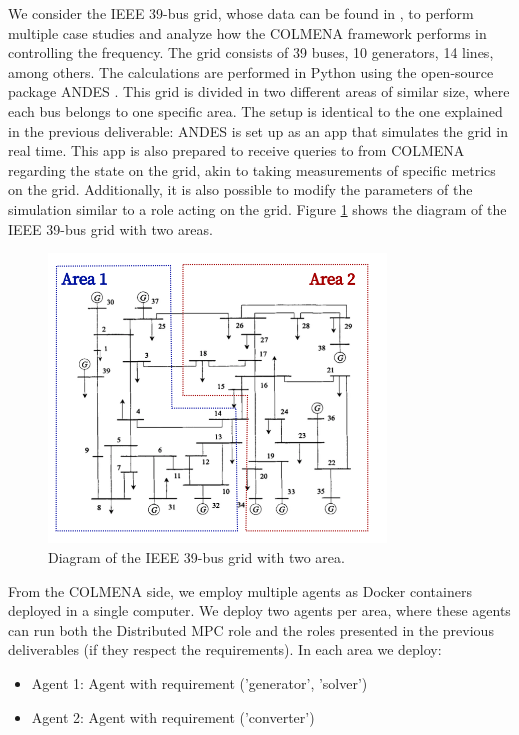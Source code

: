 \documentclass{article}
\begin{document}
We consider the IEEE 39-bus grid, whose data can be found in \cite{grids:ieee39}, to perform multiple case studies and analyze how the COLMENA framework performs in controlling the frequency. The grid consists of 39 buses, 10 generators, 14 lines, among others. The calculations are performed in Python using the open-source package ANDES \cite{grids:models}. This grid is divided in two different areas of similar size, where each bus belongs to one specific area. The setup is identical to the one explained in the previous deliverable: ANDES is set up as an app that simulates the grid in real time. This app is also prepared to receive queries to from COLMENA regarding the state on the grid, akin to taking measurements of specific metrics on the grid. Additionally, it is also possible to modify the parameters of the simulation similar to a role acting on the grid. Figure \ref{fig:ieee39_2areas} shows the diagram of the IEEE 39-bus grid with two areas.

\begin{figure}[ht]
    \centering
    \includegraphics[width=0.8\textwidth]{figures/ieee2areas.png}
    \caption{Diagram of the IEEE 39-bus grid with two area.}
    \label{fig:ieee39_2areas}
\end{figure}

From the COLMENA side, we employ multiple agents as Docker containers deployed in a single computer. We deploy two agents per area, where these agents can run both the Distributed MPC role and the roles presented in the previous deliverables (if they respect the requirements). In each area we deploy:

\begin{itemize}
    \item Agent 1: Agent with requirement ('generator', 'solver') 
    \item Agent 2: Agent with requirement ('converter') 
\end{itemize}
\end{document}
